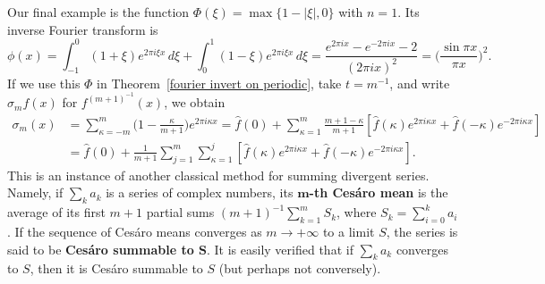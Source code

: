 \begin{example}
Our final example is the function $\Phi(\xi)=\max\{1-|\xi|,0\}$ with $n=1$. Its inverse Fourier transform is
\[\phi(x)=\int_{-1}^{0}(1+\xi)e^{2\pi i\xi x}\,d\xi+\int_{0}^{1}(1-\xi)e^{2\pi i\xi x}\,d\xi=\frac{e^{2\pi ix}-e^{-2\pi ix}-2}{(2\pi ix)^2}=\Big(\frac{\sin\pi x}{\pi x}\Big)^2.\]
If we use this $\Phi$ in Theorem~\ref{fourier invert on periodic}, take $t=m^{-1}$, and write $\sigma_mf(x)$ for $f^{(m+1)^{-1}}(x)$, we obtain
\begin{align*}
\sigma_m(x)&=\sum_{\kappa=-m}^{m}\Big(1-\frac{\kappa}{m+1}\Big)e^{2\pi i\kappa x}=\hat{f}(0)+\sum_{\kappa=1}^{m}\frac{m+1-\kappa}{m+1}[\hat{f}(\kappa)e^{2\pi i\kappa x}+\hat{f}(-\kappa)e^{-2\pi i\kappa x}]\\
&=\hat{f}(0)+\frac{1}{m+1}\sum_{j=1}^{m}\sum_{\kappa=1}^{j}[\hat{f}(\kappa)e^{2\pi i\kappa x}+\hat{f}(-\kappa)e^{-2\pi i\kappa x}].
\end{align*}
This is an instance of another classical method for summing divergent series. Namely, if $\sum_ka_k$ is a series of complex numbers, its \textbf{$\bm{m}$-th Ces\'aro mean} is the average of its first $m+1$ partial sums $(m+1)^{-1}\sum_{k=1}^{m}S_k$, where $S_k=\sum_{i=0}^{k}a_i$. If the sequence of Ces\'aro means converges as $m\to+\infty$ to a limit $S$, the series is said to be \textbf{Ces\'aro summable to $\bm{S}$}. It is easily verified that if $\sum_ka_k$ converges to $S$, then it is Ces\'aro summable to $S$ (but perhaps not conversely).
\end{example}

